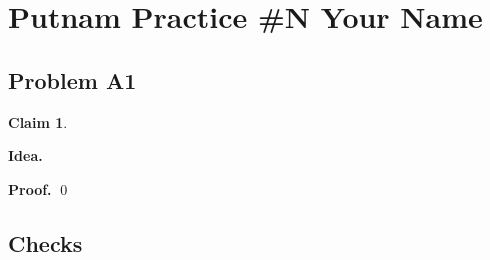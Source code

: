 \documentclass[11pt]{article}
\newtheorem*{claim}{Claim}
\begin{document}
\section*{Putnam Practice \#N \quad Your Name}
\subsection*{Problem A1}
\begin{claim}
\end{claim}
\textbf{Idea.} %
\medskip

\textbf{Proof.} %
\qed

\subsection*{Checks}
\end{document}
